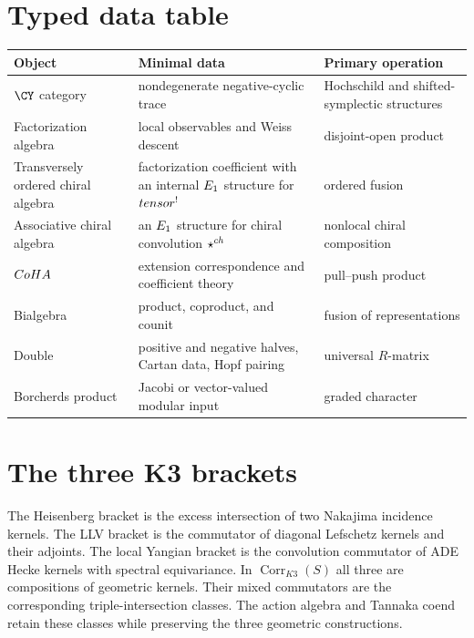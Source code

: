 \chapter{Typed data table}
\begin{center}
\small
\begin{tabularx}{0.98\textwidth}{@{}>{\raggedright\arraybackslash}p{}>{\raggedright\arraybackslash}X>{\raggedright\arraybackslash}p{}@{}}
\toprule
\textbf{Object}&\textbf{Minimal data}&\textbf{Primary operation}\\
\midrule
$\CY$ category&nondegenerate negative-cyclic trace&Hochschild and shifted-symplectic structures\\
Factorization algebra&local observables and Weiss descent&disjoint-open product\\
Transversely ordered chiral algebra&factorization coefficient with an internal $E_1$ structure for $tensor^!$&ordered fusion\\
Associative chiral algebra&an $E_1$ structure for chiral convolution $\mathbin{\star^{ch}}$&nonlocal chiral composition\\
$CoHA$&extension correspondence and coefficient theory&pull--push product\\
Bialgebra&product, coproduct, and counit&fusion of representations\\
Double&positive and negative halves, Cartan data, Hopf pairing&universal $R$-matrix\\
Borcherds product&Jacobi or vector-valued modular input&graded character\\
\bottomrule
\end{tabularx}
\end{center}

\chapter{The three K3 brackets}
The Heisenberg bracket is the excess intersection of two Nakajima incidence kernels.  The LLV bracket is the commutator of diagonal Lefschetz kernels and their adjoints.  The local Yangian bracket is the convolution commutator of ADE Hecke kernels with spectral equivariance.  In $\operatorname{Corr}_{K3}(S)$ all three are compositions of geometric kernels.  Their mixed commutators are the corresponding triple-intersection classes.  The action algebra and Tannaka coend retain these classes while preserving the three geometric constructions.


